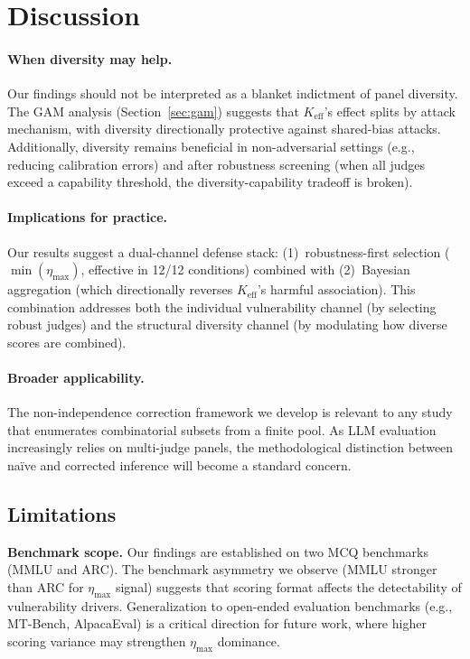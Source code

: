 \documentclass[11pt,a4paper]{article}
\newcommand{\etamax}{\ensuremath{\eta_{\max}}}
\newcommand{\keff}{\ensuremath{K_{\text{eff}}}}
\begin{document}
\section{Discussion}
\label{sec:discussion}

\paragraph{When diversity may help.}
Our findings should not be interpreted as a blanket indictment of panel diversity.
The GAM analysis (Section~\ref{sec:gam}) suggests that $\keff$'s effect splits by attack mechanism, with diversity directionally protective against shared-bias attacks.
Additionally, diversity remains beneficial in non-adversarial settings (e.g., reducing calibration errors) and after robustness screening (when all judges exceed a capability threshold, the diversity-capability tradeoff is broken).

\paragraph{Implications for practice.}
Our results suggest a dual-channel defense stack: (1)~robustness-first selection ($\min(\etamax)$, effective in 12/12 conditions) combined with (2)~Bayesian aggregation (which directionally reverses $\keff$'s harmful association).
This combination addresses both the individual vulnerability channel (by selecting robust judges) and the structural diversity channel (by modulating how diverse scores are combined).

\paragraph{Broader applicability.}
The non-independence correction framework we develop is relevant to any study that enumerates combinatorial subsets from a finite pool.
As LLM evaluation increasingly relies on multi-judge panels, the methodological distinction between na\"ive and corrected inference will become a standard concern.

\subsection{Limitations}

\textbf{Benchmark scope.}
Our findings are established on two MCQ benchmarks (MMLU and ARC).
The benchmark asymmetry we observe (MMLU stronger than ARC for $\etamax$ signal) suggests that scoring format affects the detectability of vulnerability drivers.
Generalization to open-ended evaluation benchmarks (e.g., MT-Bench, AlpacaEval) is a critical direction for future work, where higher scoring variance may strengthen $\etamax$ dominance.
\end{document}
